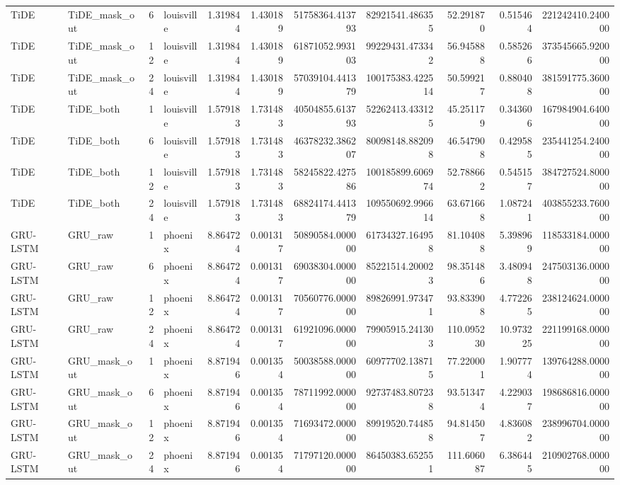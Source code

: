 \begin{longtable}{llrlrrrrrrr}
TiDE & TiDE\_mask\_out & 6 & louisville & 1.319844 & 1.430189 & 51758364.413793 & 82921541.486355 & 52.291870 & 0.515464 & 221242410.240000 \\
TiDE & TiDE\_mask\_out & 12 & louisville & 1.319844 & 1.430189 & 61871052.993103 & 99229431.473342 & 56.945888 & 0.585266 & 373545665.920000 \\
TiDE & TiDE\_mask\_out & 24 & louisville & 1.319844 & 1.430189 & 57039104.441379 & 100175383.422514 & 50.599217 & 0.880408 & 381591775.360000 \\
TiDE & TiDE\_both & 1 & louisville & 1.579183 & 1.731483 & 40504855.613793 & 52262413.433125 & 45.251179 & 0.343606 & 167984904.640000 \\
TiDE & TiDE\_both & 6 & louisville & 1.579183 & 1.731483 & 46378232.386207 & 80098148.882098 & 46.547908 & 0.429585 & 235441254.240000 \\
TiDE & TiDE\_both & 12 & louisville & 1.579183 & 1.731483 & 58245822.427586 & 100185899.606974 & 52.788662 & 0.545157 & 384727524.800000 \\
TiDE & TiDE\_both & 24 & louisville & 1.579183 & 1.731483 & 68824174.441379 & 109550692.996614 & 63.671668 & 1.087241 & 403855233.760000 \\
GRU-LSTM & GRU\_raw & 1 & phoenix & 8.864724 & 0.001317 & 50890584.000000 & 61734327.164958 & 81.104088 & 5.398969 & 118533184.000000 \\
GRU-LSTM & GRU\_raw & 6 & phoenix & 8.864724 & 0.001317 & 69038304.000000 & 85221514.200023 & 98.351486 & 3.480948 & 247503136.000000 \\
GRU-LSTM & GRU\_raw & 12 & phoenix & 8.864724 & 0.001317 & 70560776.000000 & 89826991.973471 & 93.833908 & 4.772265 & 238124624.000000 \\
GRU-LSTM & GRU\_raw & 24 & phoenix & 8.864724 & 0.001317 & 61921096.000000 & 79905915.241303 & 110.095230 & 10.973225 & 221199168.000000 \\
GRU-LSTM & GRU\_mask\_out & 1 & phoenix & 8.871946 & 0.001354 & 50038588.000000 & 60977702.138715 & 77.220001 & 1.907774 & 139764288.000000 \\
GRU-LSTM & GRU\_mask\_out & 6 & phoenix & 8.871946 & 0.001354 & 78711992.000000 & 92737483.807238 & 93.513474 & 4.229037 & 198686816.000000 \\
GRU-LSTM & GRU\_mask\_out & 12 & phoenix & 8.871946 & 0.001354 & 71693472.000000 & 89919520.744858 & 94.814507 & 4.836082 & 238996704.000000 \\
GRU-LSTM & GRU\_mask\_out & 24 & phoenix & 8.871946 & 0.001354 & 71797120.000000 & 86450383.652551 & 111.606087 & 6.386445 & 210902768.000000 \\

\end{longtable}
